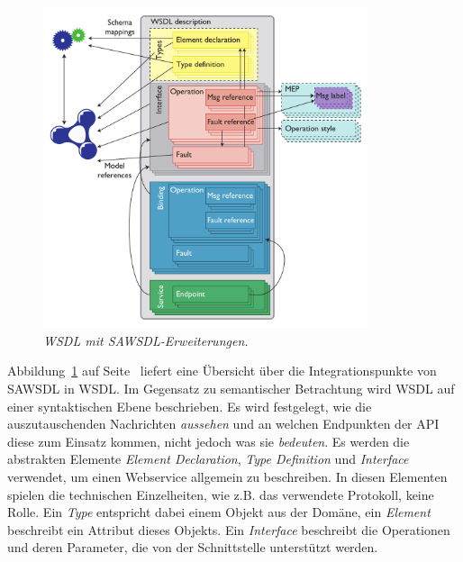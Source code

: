 \begin{figure}[ht]
\centering
\parbox{0.85\textwidth}{
    \includegraphics[width=0.85\textwidth]{media/sawsdl.png}
    \caption{\emph{\ac{WSDL} mit \ac{SAWSDL}-Erweiterungen.} \cite[S.61]{ky-sawsdl}
}
    \label{f:sawsdl}
}
\end{figure}

Abbildung~\ref{f:sawsdl} auf Seite~\pageref{f:sawsdl} liefert eine Übersicht über die Integrationspunkte von \ac{SAWSDL} in \ac{WSDL}. Im Gegensatz zu semantischer Betrachtung wird \ac{WSDL} auf einer syntaktischen Ebene beschrieben. Es wird festgelegt, wie die auszutauschenden Nachrichten \emph{aussehen} und an welchen Endpunkten der \ac{API} diese zum Einsatz kommen, nicht jedoch was sie \emph{bedeuten}. Es werden die abstrakten Elemente \emph{Element Declaration}, \emph{Type Definition} und \emph{Interface} verwendet, um einen Webservice allgemein zu beschreiben. In diesen Elementen spielen die technischen Einzelheiten, wie z.B. das verwendete Protokoll, keine Rolle. Ein \emph{Type} entspricht dabei einem Objekt aus der Domäne, ein \emph{Element} beschreibt ein Attribut dieses Objekts. Ein \emph{Interface} beschreibt die Operationen und deren Parameter, die von der Schnittstelle unterstützt werden. 


